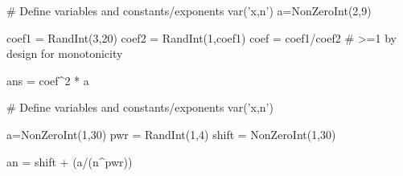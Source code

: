 \begin{sagesilent}
# Define variables and constants/exponents
var('x,n')
a=NonZeroInt(2,9)

coef1 = RandInt(3,20)
coef2 = RandInt(1,coef1)
coef = coef1/coef2 # >=1 by design for monotonicity

ans = coef^2 * a
\end{sagesilent}







%
%
%
%
%
%
%
%
%
%
%
%
%
%
%
%
%



\begin{sagesilent}
# Define variables and constants/exponents
var('x,n')


a=NonZeroInt(1,30)
pwr = RandInt(1,4)
shift = NonZeroInt(1,30)

an = shift + (a/(n^pwr))



\end{sagesilent}

